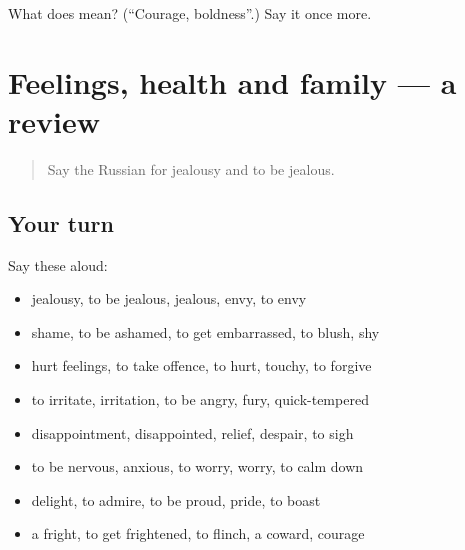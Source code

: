 \begin{tcolorbox}[breakable,colback=teal!4,colframe=teal!35!black,title={Before you move on}]
What does  mean? (\textquotedblleft{}Courage, boldness\textquotedblright{}.) Say it once more.
\end{tcolorbox}
\section[(dialogue)]{Feelings, health and family — a review}

\label{lesson:RU-R476-review-469-476}



\begin{quote}
Say the Russian for jealousy and to be jealous.
\end{quote}

\subsection*{Your turn}
Say these aloud:

\begin{itemize}
\raggedright
  \item jealousy, to be jealous, jealous, envy, to envy
  \item shame, to be ashamed, to get embarrassed, to blush, shy
  \item hurt feelings, to take offence, to hurt, touchy, to forgive
  \item to irritate, irritation, to be angry, fury, quick-tempered
  \item disappointment, disappointed, relief, despair, to sigh
  \item to be nervous, anxious, to worry, worry, to calm down
  \item delight, to admire, to be proud, pride, to boast
  \item a fright, to get frightened, to flinch, a coward, courage
\end{itemize}

